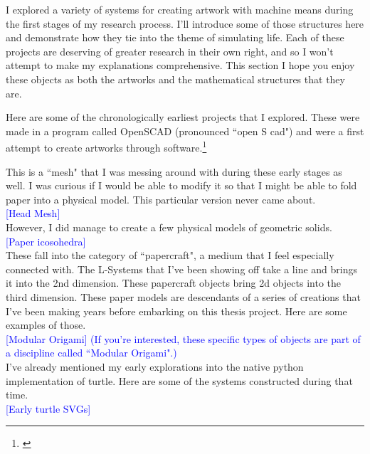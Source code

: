\documentclass[12pt,twoside]{reedthesis}
\begin{document}
	I explored a variety of systems for creating artwork with machine means during the first stages of my research process. I'll introduce some of those structures here and demonstrate how they tie into the theme of simulating life. Each of these projects are deserving of greater research in their own right, and so I won't attempt to make my explanations comprehensive. This section I hope you enjoy these objects as both the artworks and the mathematical structures that they are.

	Here are some of the chronologically earliest projects that I explored. These were made in a program called OpenSCAD (pronounced ``open S cad") and were a first attempt to create artworks through software.\footnote{\cite{openSCAD}}
	
	
	This is a ``mesh" that I was messing around with during these early stages as well. I was curious if I would be able to modify it so that I might be able to fold paper into a physical model. This particular version never came about.\\
	
	\textcolor{blue}{[Head Mesh]}\\
	
	However, I did manage to create a few physical models of geometric solids.\\
	
	\textcolor{blue}{[Paper icosohedra]}\\
	
	These fall into the category of ``papercraft", a medium that I feel especially connected with. The L-Systems that I've been showing off take a line and brings it into the 2nd dimension. These papercraft objects bring 2d objects into the third dimension. These paper models are descendants of a series of creations that I've been making years before embarking on this thesis project. Here are some examples of those.\\
	
	\textcolor{blue}{[Modular Origami] (If you're interested, these specific types of objects are part of a discipline called ``Modular Origami".)}\\
	
	I've already mentioned my early explorations into the native python implementation of turtle. Here are some of the systems constructed during that time.\\
	
	\textcolor{blue}{[Early turtle SVGs]}\\
	
\end{document}
